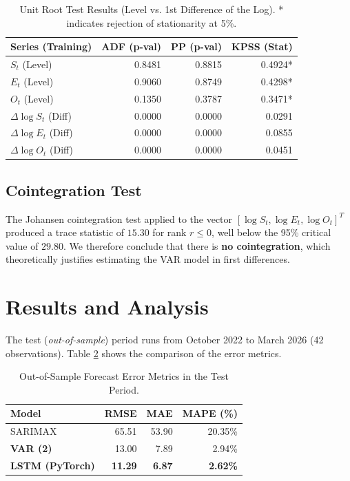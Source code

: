 \documentclass[11pt,a4paper]{article}
\begin{document}
\begin{table}[ht]
\centering
\small
\begin{tabular}{lrrr}
\toprule
\textbf{Series (Training)} & \textbf{ADF (p-val)} & \textbf{PP (p-val)} & \textbf{KPSS (Stat)} \\
\midrule
$S_t$ (Level) & 0.8481 & 0.8815 & 0.4924* \\
$E_t$ (Level) & 0.9060 & 0.8749 & 0.4298* \\
$O_t$ (Level) & 0.1350 & 0.3787 & 0.3471* \\
\midrule
$\Delta \log S_t$ (Diff) & 0.0000 & 0.0000 & 0.0291 \\
$\Delta \log E_t$ (Diff) & 0.0000 & 0.0000 & 0.0855 \\
$\Delta \log O_t$ (Diff) & 0.0000 & 0.0000 & 0.0451 \\
\bottomrule
\end{tabular}
\caption{Unit Root Test Results (Level vs. 1st Difference of the Log). * indicates rejection of stationarity at 5\%.}
\label{tab:roots}
\end{table}

\subsection{Cointegration Test}
The Johansen cointegration test applied to the vector $[\log S_t, \log E_t, \log O_t]^T$ produced a trace statistic of $15.30$ for rank $r \leq 0$, well below the 95\% critical value of $29.80$. We therefore conclude that there is \textbf{no cointegration}, which theoretically justifies estimating the VAR model in first differences.

\section{Results and Analysis}
The test (\textit{out-of-sample}) period runs from October 2022 to March 2026 (42 observations). Table \ref{tab:errors} shows the comparison of the error metrics.

\begin{table}[ht]
\centering
\small
\begin{tabular}{lrrr}
\toprule
\textbf{Model} & \textbf{RMSE} & \textbf{MAE} & \textbf{MAPE (\%)} \\
\midrule
SARIMAX & 65.51 & 53.90 & 20.35\% \\
\textbf{VAR (2)} & 13.00 & 7.89 & 2.94\% \\
\textbf{LSTM (PyTorch)} & \textbf{11.29} & \textbf{6.87} & \textbf{2.62\%} \\
\bottomrule
\end{tabular}
\caption{Out-of-Sample Forecast Error Metrics in the Test Period.}
\label{tab:errors}
\end{table}
\end{document}

